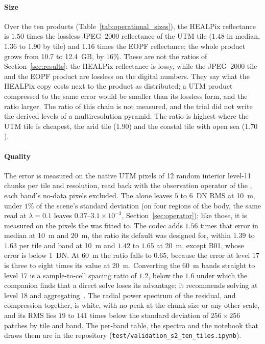 \paragraph{Size}
Over the ten products (Table~\ref{tab:operational_sizes}), the HEALPix
reflectance is $1.50$ times the lossless JPEG~2000 reflectance of the
UTM tile ($1.48$ in median, $1.36$ to $1.90$ by tile) and $1.16$ times
the EOPF reflectance; the whole product grows from 10.7 to 12.4~GB, by
$16\%$. These are not the  ratios of
Section~\ref{sec:results}: the HEALPix reflectance is lossy, while the
JPEG~2000 tile and the EOPF product are lossless on the digital numbers.
They say what the HEALPix copy costs next to the product as distributed;
a UTM product compressed to the same error would be smaller than its
lossless form, and the ratio larger. The  ratio of
this chain is not measured, and the trial did not write the derived
levels of a multiresolution pyramid. The ratio is highest where the UTM
tile is cheapest, the arid tile ($1.90$) and the coastal tile with open
sea ($1.70$).



\paragraph{Quality}
The error is measured on the native UTM pixels of 12 random interior
level-11 chunks per tile and resolution, read back with the observation
operator of the , each band's no-data pixels excluded.
The  alone leaves $5$ to $6$~DN RMS at \SI{10}{m}, under
$1\%$ of the scene's standard deviation (on four regions of the body, the same read at
$\lambda=0.1$ leaves $0.37$--$3.1\times10^{-3}$,
Section~\ref{sec:operator}); like those, it is measured on the pixels
the  was fitted to.
The codec adds $1.56$ times that error in median at \SI{10}{m} and
\SI{20}{m}, the ratio its default was designed for, within $1.39$ to
$1.63$ per tile and band at \SI{10}{m} and $1.42$ to $1.65$ at
\SI{20}{m}, except B01, whose  error is below 1~DN. At
\SI{60}{m} the ratio falls to $0.65$, because the  error
at level 17 is three to eight times its value at \SI{20}{m}. Converting
the \SI{60}{m} bands straight to level 17 is a sample-to-cell spacing
ratio of $1.2$, below the $1.6$ under which the companion finds that a
direct solve loses its advantage; it recommends solving at level 18 and
aggregating~\cite{delouis2026resample}. The radial
power spectrum of the residual,  and compression together,
is white, with no peak at the chunk size or any other scale, and its RMS
lies $19$ to $141$ times below the standard deviation of $256\times256$
patches by tile and band. The per-band table, the spectra and the
notebook that draws them are in the repository
(\texttt{test/validation\_s2\_ten\_tiles.ipynb}).

